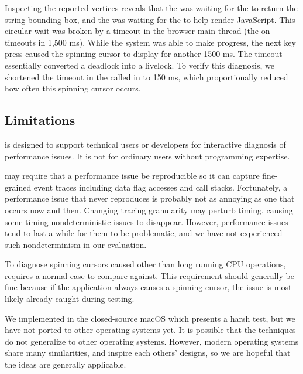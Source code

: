 Inspecting the reported vertices reveals that the  was waiting
for the  to return the string bounding box, and the
 was waiting for the  to help render JavaScript.
This circular wait was broken by a timeout in the browser main thread (the
 on  timeouts in 1,500 ms). While the system
was able to make progress, the next key press caused the spinning cursor to
display for another 1500 ms. The timeout essentially converted a deadlock
into a livelock. To verify this diagnosis, we shortened the timeout in the
 called in  to 150 ms, which
proportionally reduced how often this spinning cursor occurs.

\subsection{Limitations} \label{subsec:limit}

\xxx is designed to support technical users or developers for interactive
diagnosis of performance issues.  It is not for ordinary users without
programming expertise.

\xxx may require that a performance issue be reproducible so it can
capture fine-grained event traces including data flag accesses and call
stacks.  Fortunately, a performance issue that never reproduces is
probably not as annoying as one that occurs now and then.  Changing
tracing granularity may perturb timing, causing some
timing-nondeterministic issues to disappear.  However, performance issues
tend to last a while for them to be problematic, and we have not
experienced such nondeterminism in our evaluation.

To diagnose spinning cursors caused other than long running CPU
operations, \xxx requires a normal case to compare against.  This
requirement should generally be fine because if the application always
causes a spinning cursor, the issue is most likely already caught during
testing.

We implemented \xxx in the closed-source macOS which presents a harsh test,
but we have not ported \xxx to other operating systems yet. It is possible
that the techniques do not generalize to other operating systems. However,
modern operating systems share many similarities, and inspire each others'
designs, so we are hopeful that the ideas are generally applicable.

